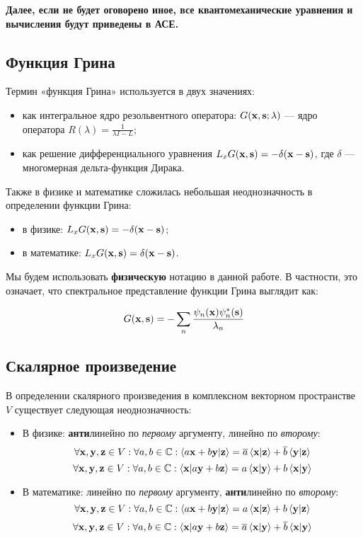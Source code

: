\textbf{Далее, если не будет оговорено иное, все квантомеханические уравнения и вычисления будут приведены в АСЕ.}

\subsection{Функция Грина}
Термин «функция Грина» используется в двух значениях:

\begin{itemize}
\item как интегральное ядро резольвентного оператора: $G(\vb{x}, \vb{s}; \lambda)$ — ядро оператора $R(\lambda) = \frac{1}{\lambda I - L}$;
\item как решение дифференциального уравнения $L_x G(\vb{x}, \vb{s}) = -\delta(\vb{x} - \vb{s})$, где $\delta$ — многомерная дельта-функция Дирака.
\end{itemize}

Также в физике и математике сложилась небольшая неоднозначность в определении функции Грина:

\begin{itemize}
\item в физике: $L_x G(\vb{x}, \vb{s}) = -\delta(\vb{x} - \vb{s})$;
\item в математике: $L_x G(\vb{x}, \vb{s}) = \delta(\vb{x} - \vb{s})$.
\end{itemize} 

Мы будем использовать \textbf{физическую} нотацию в данной работе. В частности, это означает, что спектральное представление функции Грина выглядит как: 

\[
G(\vb{x}, \vb{s}) = -\sum\limits_n \frac{\psi_n(\vb{x}) \psi_n^*(\vb{s})}{\lambda_n}
\]

\subsection{Скалярное произведение}
В определении скалярного произведения в комплексном векторном пространстве $V$ существует следующая неоднозначность:

\begin{itemize}
\item В физике: \textbf{анти}линейно по \textit{первому} аргументу, линейно по \textit{второму}:
\[
\forall \vb{x}, \vb{y}, \vb{z} \in V: \forall a, b \in \bbC: \ip{a\vb{x} + b\vb{y}}{\vb{z}} = \cconj{a} \ip{\vb{x}}{\vb{z}} + \cconj{b} \ip{\vb{y}}{\vb{z}}
\]
\[
\forall \vb{x}, \vb{y}, \vb{z} \in V: \forall a, b \in \bbC: \ip{\vb{x}}{a\vb{y} + b\vb{z}} = a \ip{\vb{x}}{\vb{y}} + b \ip{\vb{x}}{\vb{y}}
\]
\item В математике: линейно по \textit{первому} аргументу, \textbf{анти}линейно по \textit{второму}:
\[
\forall \vb{x}, \vb{y}, \vb{z} \in V: \forall a, b \in \bbC: \ip{a\vb{x} + b\vb{y}}{\vb{z}} = a \ip{\vb{x}}{\vb{z}} + b \ip{\vb{y}}{\vb{z}}
\]
\[
\forall \vb{x}, \vb{y}, \vb{z} \in V: \forall a, b \in \bbC: \ip{\vb{x}}{a\vb{y} + b\vb{z}} = \cconj{a} \ip{\vb{x}}{\vb{y}} + \cconj{b} \ip{\vb{x}}{\vb{y}}
\]
\end{itemize}

